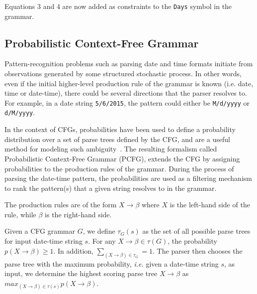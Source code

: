 Equations $3$ and $4$ are now added as constraints to the \texttt{Days} symbol in the grammar.

\subsection{Probabilistic Context-Free Grammar}

Pattern-recognition problems such as parsing date and time formats initiate from observations generated by some structured stochastic process. In other words, even if the initial higher-level production rule of the grammar is known (i.e. date, time or date-time), there could be several directions that the parser resolves to. For example, in a date string \texttt{5/6/2015}, the pattern could either be \texttt{M/d/yyyy} or \texttt{d/M/yyyy}. 

In the context of CFGs, probabilities have been used to define a probability distribution over a set of parse trees defined by the CFG, and are a useful method for modeling such ambiguity~\cite{Collins:2003,Manning:1999}. The resulting formalism called Probabilistic Context-Free Grammar (PCFG), extends the CFG by assigning probabilities to the production rules of the grammar. During the process of parsing the date-time pattern, the probabilities are used as a filtering mechanism to rank the pattern(s) that a given string resolves to in the grammar. 

The production rules are of the form $ X \rightarrow \beta$ where $X$ is the left-hand side of the rule, while $\beta$ is the right-hand side.

Given a CFG grammar $G$, we define  $\tau_G(s)$ as the set of all possible parse trees for input date-time string $s$.  For any $X \rightarrow \beta \in \tau(G)$, the probability $p(X \rightarrow \beta) \ge 1$. In addition, $\sum_{(X \rightarrow \beta) \in \tau_{G}} = 1$. The parser then chooses the parse tree with the maximum probability, \textit{i.e.} given a date-time string $s$, as input, we determine the highest scoring parse tree $X \rightarrow \beta$ as  $max_{(X \rightarrow \beta) \in \tau(s)} p(X \rightarrow \beta)$.

